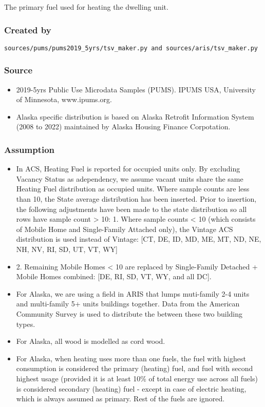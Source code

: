 The primary fuel used for heating the dwelling unit.

\subsubsection{Created by}\label{created-by-86}

\texttt{sources/pums/pums2019\_5yrs/tsv\_maker.py\ and\ sources/aris/tsv\_maker.py}

\subsubsection{Source}\label{source-85}

\begin{itemize}
 
\item
  2019-5yrs Public Use Microdata Samples (PUMS). IPUMS USA, University
  of Minnesota, www.ipums.org.
\item
  Alaska specific distribution is based on Alaska Retrofit Information
  System (2008 to 2022) maintained by Alaska Housing Finance
  Corpotation.
\end{itemize}

\subsubsection{Assumption}\label{assumption-50}

\begin{itemize}
 
\item
  In ACS, Heating Fuel is reported for occupied units only. By excluding
  Vacancy Status as adependency, we assume vacant units share the same
  Heating Fuel distribution as occupied units. Where sample counts are
  less than 10, the State average distribution has been inserted. Prior
  to insertion, the following adjustments have been made to the state
  distribution so all rows have sample count \textgreater{} 10: 1. Where
  sample counts \textless{} 10 (which consists of Mobile Home and
  Single-Family Attached only), the Vintage ACS distribution is used
  instead of Vintage: {[}CT, DE, ID, MD, ME, MT, ND, NE, NH, NV, RI, SD,
  UT, VT, WY{]}
\item
  2. Remaining Mobile Homes \textless{} 10 are replaced by Single-Family
  Detached + Mobile Homes combined: {[}DE, RI, SD, VT, WY, and all
  DC{]}.
\item
  For Alaska, we are using a field in ARIS that lumps muti-family 2-4
  units and multi-family 5+ units buildings together. Data from the
  American Community Survey is used to distribute the between these two
  building types.
\item
  For Alaska, all wood is modelled as cord wood.
\item
  For Alaska, when heating uses more than one fuels, the fuel with
  highest consumption is considered the primary (heating) fuel, and fuel
  with second highest usage (provided it is at least 10\% of total
  energy use across all fuels) is considered secondary (heating) fuel -
  except in case of electric heating, which is always assumed as
  primary. Rest of the fuels are ignored.
\end{itemize}

